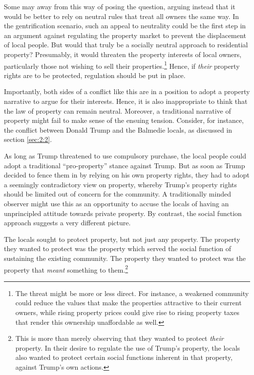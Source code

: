Some may  away from this way of posing the question,  arguing instead that it would be better to rely on neutral rules that treat all owners the same way. In the gentrification scenario, such an appeal to neutrality could be the first step in an argument against regulating the property market to prevent the displacement of local people. But would that truly be a socially neutral approach to residential property? Presumably, it would threaten the property interests of local owners, particularly those not wishing to sell their properties.\footnote{The threat might be more or less direct. For instance, a weakened community could reduce the values that make the properties attractive to their current owners, while rising property prices could give rise to rising property taxes that render this ownership unaffordable as well.} Hence, if {\it their} property rights are to be protected, regulation should be put in place.

Importantly, both sides of a conflict like this are in a position to adopt a property narrative to argue for their interests. Hence, it is also inappropriate to think that the law of property can remain neutral. Moreover, a traditional narrative of property might fail to make sense of the ensuing tension. Consider, for instance, the conflict between Donald Trump and the Balmedie locals, as discussed in section \ref{sec:2:2}.

As long as Trump threatened to use compulsory purchase, the local people could adopt a traditional ``pro-property'' stance against Trump. But as soon as Trump decided to fence them in by relying on his own property rights, they had to adopt a seemingly contradictory view on property, whereby Trump's property rights should be limited out of concern for the community. A traditionally minded observer might use this as an opportunity to accuse the locals of having an unprincipled attitude towards private property. By contrast, the social function approach suggests a very different picture.

The locals sought to protect property, but not just any property. The property they wanted to protect was the property which served the social function of sustaining the existing community. The property they wanted to protect was the property that {\it meant} something to them.\footnote{This is more than merely observing that they wanted to protect {\it their} property. In their desire to regulate the use of Trump's property, the locals also wanted to protect certain social functions inherent in that property, against Trump's own actions.} 

